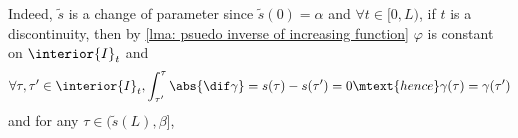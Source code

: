     Indeed, $\tilde{s}$ is a change of parameter since $\tilde{s}(0) = \alpha$ and $\forall t\in[0,L)$,
    if $t$ is a discontinuity,
    then by \cref{lma: psuedo inverse of increasing function} $\varphi$ is constant on $\interior{I}_t$ and
    \begin{equation*}
        \forall \tau, \tau'\in \interior{I}_t,
        \int^{\tau}_{\tau'} \abs{\dif \gamma} = s(\tau)-s(\tau') = 0 \mtext{hence} \gamma(\tau) = \gamma(\tau')
    \end{equation*}  and for any
    $\tau\in (\tilde{s}(L), \beta]$,
